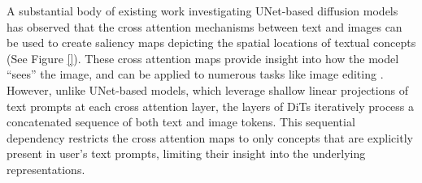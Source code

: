 A substantial body of existing work investigating UNet-based diffusion models \cite{} has observed that the cross attention mechanisms between text and images can be used to create saliency maps depicting the spatial locations of textual concepts (See Figure \ref{}). These cross attention maps provide insight into how the model ``sees'' the image, and can be applied to numerous tasks like image editing \cite{}. However, unlike UNet-based models, which leverage shallow linear projections of text prompts at each cross attention layer, the \layername layers of DiTs iteratively process a concatenated sequence of both text and image tokens. This sequential dependency restricts the cross attention maps to only concepts that are explicitly present in user's text prompts, limiting their insight into the underlying representations. 

